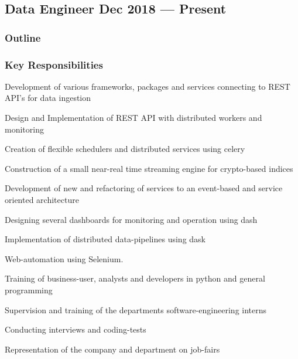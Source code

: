 \documentclass[letter,10pt]{article}
\begin{document}
\subsection{{Data Engineer \hfill Dec 2018 --- Present}}

\subsubsection*{{Outline}}

\subsubsection*{{Key Responsibilities}}

\begin{zitemize}
\item Development of various frameworks, packages and services connecting to REST API’s for data ingestion
			
			\item Design and Implementation of REST API with distributed workers and monitoring
			
			\item Creation of flexible schedulers and distributed services using celery
			
			\item Construction of a small near-real time streaming engine for crypto-based indices
			
			\item Development of new and refactoring of services to an event-based and service oriented architecture
			
			\item Designing several dashboards for monitoring and operation using dash
			
			\item Implementation of distributed data-pipelines using dask
			
			\item Web-automation using Selenium.
			
			\item Training of business-user, analysts and developers in python and general programming
			
			\item Supervision  and  training  of  the  departments  software-engineering interns
			
			\item Conducting interviews and coding-tests

			\item Representation of the company and department on job-fairs

\end{zitemize}
\end{document}
